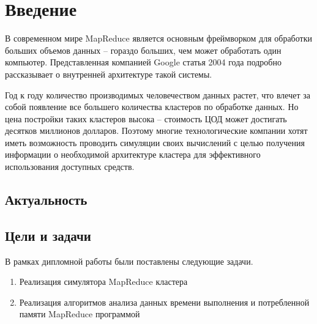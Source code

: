 \documentclass[../diploma.tex]{subfile}
\begin{document}
    \section{Введение}\label{sec:introduction}

    В современном мире MapReduce является основным фреймворком для обработки
    больших объемов данных -- гораздо больших, чем может обработать один
    компьютер. Представленная компанией Google статья \cite{google_mapreduce}
    2004 года подробно рассказывает о внутренней архитектуре такой системы. 

    Год к году количество производимых человечеством данных растет, что влечет
    за собой появление все большего количества кластеров по обработке данных. Но
    цена постройки таких кластеров высока -- стоимость ЦОД может достигать
    десятков миллионов долларов. Поэтому многие технологические компании хотят
    иметь возможность проводить симуляции своих вычислений с целью получения
    информации о необходимой архитектуре кластера для эффективного использования
    доступных средств.

    \subsection{Актуальность}\label{subsec:relevance}

    

    \subsection{Цели и задачи}\label{subsec:goals}

    В рамках дипломной работы были поставлены следующие задачи.

    \begin{enumerate}
        \item Реализация симулятора MapReduce кластера
        \item Реализация алгоритмов анализа данных времени выполнения и
        потребленной памяти MapReduce программой
    \end{enumerate}
\end{document}
